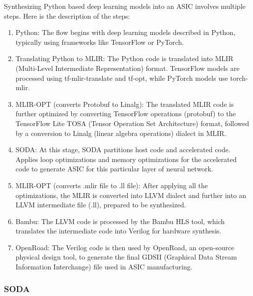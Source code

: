 Synthesizing Python based deep learning models into an ASIC involves multiple steps. Here is the description of the steps:

\begin{enumerate}
    
    \item Python: The flow begins with deep learning models described in Python, typically using frameworks like TensorFlow or PyTorch.

    \item Translating Python to MLIR: The Python code is translated into MLIR (Multi-Level Intermediate Representation) format. TensorFlow models are processed using tf-mlir-translate and tf-opt, while PyTorch models use torch-mlir.

    \item MLIR-OPT (converts Protobuf to Linalg): The translated MLIR code is further optimized by converting TensorFlow operations (protobuf) to the TensorFlow Lite TOSA (Tensor Operation Set Architecture) format, followed by a conversion to Linalg (linear algebra operations) dialect in MLIR.

    \item SODA: At this stage, SODA partitions host code and accelerated code. Applies loop optimizations and memory optimizations for the accelerated code to generate ASIC for this particular layer of neural network.

    \item MLIR-OPT (converts .mlir file to .ll file): After applying all the optimizations, the MLIR is converted into LLVM dialect and further into an LLVM intermediate file (.ll), prepared to be synthesized.

    \item Bambu: The LLVM code is processed by the Bambu HLS tool, which translates the intermediate code into Verilog for hardware synthesis.

    \item OpenRoad: The Verilog code is then used by OpenRoad, an open-source physical design tool, to generate the final GDSII (Graphical Data Stream Information Interchange) file used in ASIC manufacturing.
    
\end{enumerate}


\subsubsection{SODA}

